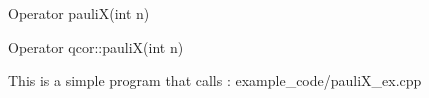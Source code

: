 
\begin{apidefinition}

\begin{Csynopsis}
    Operator pauliX(int n)
\end{Csynopsis}

\begin{Cppsynopsis}
    Operator qcor::pauliX(int n)
\end{Cppsynopsis}


\begin{apiarguments}
\end{apiarguments}



\apinotes{
    
}

\begin{apiexamples}

\apicppexample
    { This is a simple program that calls : } 
    { example_code/pauliX_ex.cpp} 
    {}
\end{apiexamples}

\end{apidefinition}
